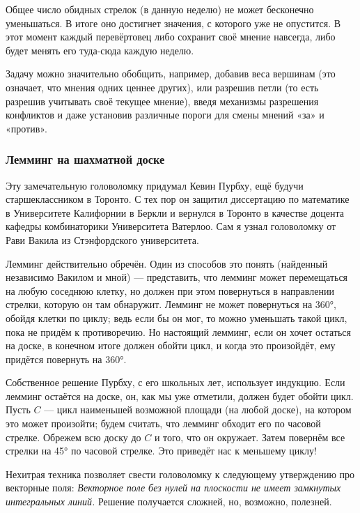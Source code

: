 Общее число обидных стрелок (в данную неделю) не может бесконечно уменьшаться.
В итоге оно достигнет значения, с которого уже не опустится.
В этот момент каждый перевёртовец либо сохранит своё мнение навсегда, либо будет менять его туда-сюда каждую неделю.

\medskip

Задачу можно значительно обобщить, например, добавив веса вершинам (это означает, что мнения одних ценнее других), или разрешив петли (то есть разрешив учитывать своё текущее мнение), введя механизмы разрешения конфликтов и даже установив различные пороги для смены мнений «за» и «против».

\subsubsection*{Лемминг на шахматной доске}

Эту замечательную головоломку придумал Кевин Пурбху, ещё будучи старшеклассником в Торонто.
С тех пор он защитил диссертацию по математике в Университете Калифорнии в Беркли и вернулся в Торонто в качестве доцента кафедры комбинаторики Университета Ватерлоо.
Сам я узнал головоломку от Рави Вакила из Стэнфордского университета.

Лемминг действительно обречён.
Один из способов это понять (найденный независимо Вакилом и мной) --- представить, что лемминг может перемещаться на любую соседнюю клетку, но должен при этом повернуться в направлении стрелки, которую он там обнаружит.
Лемминг не может повернуться на 360°, обойдя клетки по циклу;
ведь если бы он мог, то можно уменьшать такой цикл, пока не придём к противоречию.
Но настоящий лемминг, если он хочет остаться на доске, в конечном итоге должен обойти цикл, и когда это произойдёт, ему придётся повернуть на 360°.

Собственное решение Пурбху, с его школьных лет, использует индукцию.
Если лемминг остаётся на доске, он, как мы уже отметили, должен будет обойти цикл.
Пусть $C$ --- цикл наименьшей возможной площади (на любой доске), на котором это может произойти; будем считать, что лемминг обходит его по часовой стрелке.
Обрежем всю доску до $C$ и того, что он окружает.
Затем повернём все стрелки на 45° по часовой стрелке.
Это приведёт нас к меньшему циклу!

\begin{addedbytheeditors}
Нехитрая техника позволяет свести головоломку к следующему утверждению про векторные поля: \emph{Векторное поле без нулей на плоскости не имеет замкнутых интегральных линий.}
Решение получается сложней, но, возможно, полезней.\pr
\end{addedbytheeditors}
